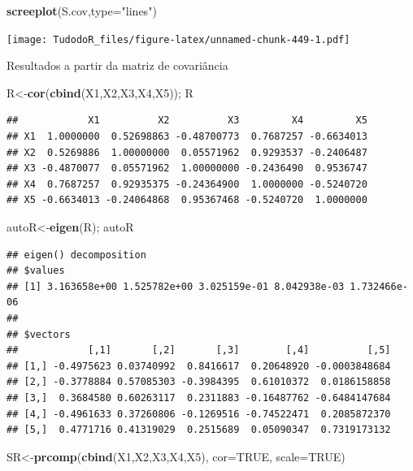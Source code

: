 \documentclass[
]{book}
\newenvironment{Shaded}{\begin{snugshade}}{\end{snugshade}}
\newcommand{\DataTypeTok}[1]{\textcolor[rgb]{0.13,0.29,0.53}{#1}}
\newcommand{\KeywordTok}[1]{\textcolor[rgb]{0.13,0.29,0.53}{\textbf{#1}}}
\newcommand{\NormalTok}[1]{#1}
\newcommand{\OtherTok}[1]{\textcolor[rgb]{0.56,0.35,0.01}{#1}}
\newcommand{\StringTok}[1]{\textcolor[rgb]{0.31,0.60,0.02}{#1}}
\begin{document}
\begin{Shaded}
\begin{Highlighting}[]
\KeywordTok{screeplot}\NormalTok{(S.cov,}\DataTypeTok{type=}\StringTok{"lines"}\NormalTok{)}
\end{Highlighting}
\end{Shaded}

\texttt{[image: TudodoR\_files/figure-latex/unnamed-chunk-449-1.pdf]}

Resultados a partir da matriz de covariância

\begin{Shaded}
\begin{Highlighting}[]
\NormalTok{R<-}\KeywordTok{cor}\NormalTok{(}\KeywordTok{cbind}\NormalTok{(X1,X2,X3,X4,X5)); }
\NormalTok{R}
\end{Highlighting}
\end{Shaded}

\begin{verbatim}
##            X1          X2          X3         X4         X5
## X1  1.0000000  0.52698863 -0.48700773  0.7687257 -0.6634013
## X2  0.5269886  1.00000000  0.05571962  0.9293537 -0.2406487
## X3 -0.4870077  0.05571962  1.00000000 -0.2436490  0.9536747
## X4  0.7687257  0.92935375 -0.24364900  1.0000000 -0.5240720
## X5 -0.6634013 -0.24064868  0.95367468 -0.5240720  1.0000000
\end{verbatim}

\begin{Shaded}
\begin{Highlighting}[]
\NormalTok{autoR<-}\KeywordTok{eigen}\NormalTok{(R);}
\NormalTok{autoR}
\end{Highlighting}
\end{Shaded}

\begin{verbatim}
## eigen() decomposition
## $values
## [1] 3.163658e+00 1.525782e+00 3.025159e-01 8.042938e-03 1.732466e-06
## 
## $vectors
##            [,1]       [,2]       [,3]        [,4]          [,5]
## [1,] -0.4975623 0.03740992  0.8416617  0.20648920 -0.0003848684
## [2,] -0.3778884 0.57085303 -0.3984395  0.61010372  0.0186158858
## [3,]  0.3684580 0.60263117  0.2311883 -0.16487762 -0.6484147684
## [4,] -0.4961633 0.37260806 -0.1269516 -0.74522471  0.2085872370
## [5,]  0.4771716 0.41319029  0.2515689  0.05090347  0.7319173132
\end{verbatim}

\begin{Shaded}
\begin{Highlighting}[]
\NormalTok{SR<-}\KeywordTok{prcomp}\NormalTok{(}\KeywordTok{cbind}\NormalTok{(X1,X2,X3,X4,X5), }\DataTypeTok{cor=}\OtherTok{TRUE}\NormalTok{, }\DataTypeTok{scale=}\OtherTok{TRUE}\NormalTok{)}
\end{Highlighting}
\end{Shaded}
\end{document}
